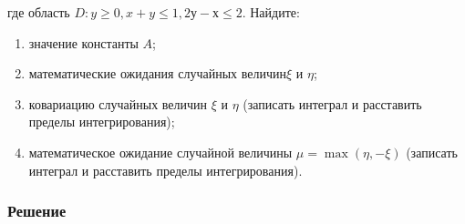 \documentclass[12pt]{article}
\begin{document}
где область $D: y \geq 0, x + y \leq 1,  2у - х \leq 2$.
Найдите:

\begin{enumerate}
	\item значение константы $A$;
	\item математические ожидания случайных величин$\xi$ и $\eta$;
	\item ковариацию случайных величин $\xi$ и $\eta$ (записать интеграл и расставить пределы интегрирования);
	\item математическое ожидание случайной величины $\mu = \max(\eta, -\xi)$ (записать интеграл и расставить пределы интегрирования).
\end{enumerate}

\subsubsection*{Решение}
\end{document}
